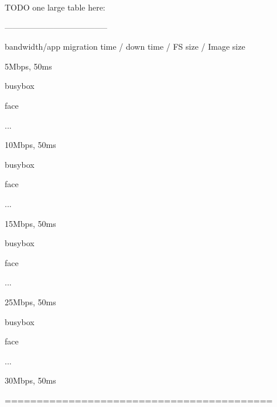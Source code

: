 
TODO one large table here:

--------------------------------------

bandwidth/app   migration time / down time  /  FS size / Image size

5Mbps, 50ms

 \quad busybox
    
 \quad   face
    
  \quad  ...
    
10Mbps, 50ms

 \quad busybox
    
 \quad   face

  \quad  ...

15Mbps, 50ms

 \quad busybox
    
 \quad   face

  \quad  ...

25Mbps, 50ms

 \quad busybox
    
 \quad   face

  \quad  ...


30Mbps, 50ms

==========================================







